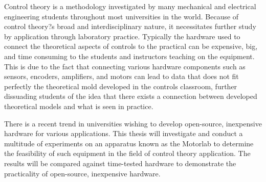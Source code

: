 
\pagestyle{empty}
\setlength{\baselineskip}{0.8cm}



Control theory is a methodology investigated by many mechanical and electrical engineering students throughout most universities in the world. Because of control theory?s broad and interdisciplinary nature, it necessitates further study by application through laboratory practice. Typically the hardware used to connect the theoretical aspects of controls to the practical can be expensive, big, and time consuming to the students and instructors teaching on the equipment. This is due to the fact that connecting various hardware components such as sensors, encoders, amplifiers, and motors can lead to data that does not fit perfectly the theoretical mold developed in the controls classroom, further dissuading students of the idea that there exists a connection between developed theoretical models and what is seen in practice. 

There is a recent trend in universities wishing to develop open-source, inexpensive hardware for various applications. This thesis will investigate and conduct a multitude of experiments on an apparatus known as the Motorlab to determine the feasibility of such equipment in the field of control theory application. The results will be compared against time-tested hardware to demonstrate the practicality of open-source, inexpensive hardware.
